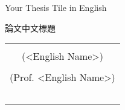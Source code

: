 \thispagestyle{empty}

\vspace{5mm}
\centerline{}
\vspace{5mm}
\centerline{}
\vspace{5mm}
\centerline{}

\vspace{30mm}

\centerline{
\LARGE
{Your Thesis Tile in English}
}

\vspace{10mm}

\centerline{
\LARGE
{論文中文標題}
}

\vspace{70mm}

\begin{tabular}{c}
\\
\\
\centerline{\large \fontsize{16pt}{\baselineskip}{研究生：<中文名>}(<English Name>)}
\\
\\
\centerline{\large \fontsize{16pt}{\baselineskip}{指導教授：<中文名> 教授}(Prof. <English Name>)}
\\
\\
\\
\\
\\
\centerline{\fontsize{16pt}{\baselineskip}{中華民國一零三年六月}}
\end{tabular}

